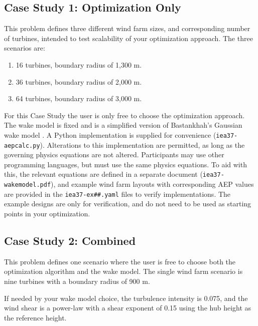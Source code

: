 \documentclass[10pt]{article}
\begin{document}
    \subsection{Case Study 1: Optimization Only}

        This problem defines three different wind farm sizes, and corresponding number of turbines, intended to test scalability of your optimization approach.  The three scenarios are:
        \begin{enumerate}
            \item 16 turbines, boundary radius of 1,300 m.
            \item 36 turbines, boundary radius of 2,000 m.
            \item 64 turbines, boundary radius of 3,000 m.
        \end{enumerate}

        For this Case Study the user is only free to choose the optimization approach.
        The wake model is fixed and is a simplified version of Bastankhah's Gaussian wake model \cite{Thomas2018, Bastankhah2014, Bastankhah2016}.
        A Python implementation is supplied for convenience (\texttt{iea37-aepcalc.py}).
        Alterations to this implementation are permitted, as long as the governing physics equations are not altered.
        Participants may use other programming languages, but must use the same physics equations.
        To aid with this, the relevant equations are defined in a separate document (\texttt{iea37-wakemodel.pdf}), and example wind farm layouts with corresponding AEP values are provided in the \texttt{iea37-ex\#\#.yaml} files to verify implementations.
        The example designs are only for verification, and do not need to be used as starting points in your optimization.

    \subsection{Case Study 2: Combined}

        This problem defines one scenario where the user is free to choose both the optimization algorithm and the wake model.
        The single wind farm scenario is nine turbines with a boundary radius of 900 m.
        
        If needed by your wake model choice, the turbulence intensity is 0.075, and the wind shear is a power-law with a shear exponent of 0.15 using the hub height as the reference height.
\end{document}
